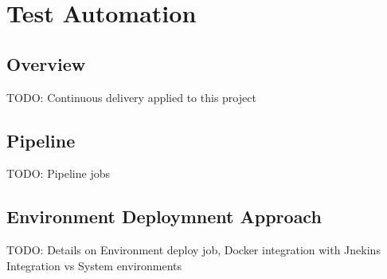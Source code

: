 
\chapter{Test Automation} %

\label{Chapter3} %




\section{Overview}
TODO: Continuous delivery applied to this project



\section{Pipeline}
TODO: Pipeline jobs



\section{Environment Deploymnent Approach}
TODO: Details on Environment deploy job, Docker integration with Jnekins Integration vs System environments
